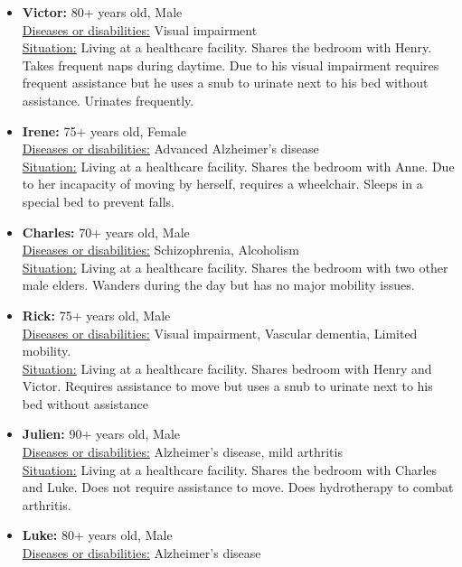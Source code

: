 \documentclass[oneside, twocolumn]{article}
\begin{document}
\begin{itemize}
	\item \textbf{Victor:} 80+ years old, Male \\
			\underline{Diseases or disabilities:} Visual impairment \\
			\underline{Situation:} Living at a healthcare facility. Shares the bedroom with Henry. Takes frequent naps during daytime. Due to his visual impairment requires frequent assistance but he uses a snub to urinate next to his bed without assistance. Urinates frequently. \\
	\item \textbf{Irene:} 75+ years old, Female \\
			\underline{Diseases or  disabilities:} Advanced Alzheimer's disease \\
			\underline{Situation:} Living at a healthcare facility. Shares the bedroom with  Anne. Due to her incapacity of moving by herself, requires a wheelchair. Sleeps in  a special bed to prevent falls. \\
	\item \textbf{Charles:} 70+ years old, Male \\
			\underline{Diseases or  disabilities:}  Schizophrenia, Alcoholism \\
			\underline{Situation:} Living at a healthcare facility. Shares the bedroom with two other male elders. Wanders during the day but has no major mobility issues. \\
	\item \textbf{Rick:} 75+ years old, Male \\
			\underline{Diseases or  disabilities:} Visual impairment, Vascular dementia,  Limited mobility. \\
			\underline{Situation:} Living at a healthcare facility. Shares bedroom with Henry and Victor. Requires assistance to move but uses a snub to urinate next to his bed without assistance \\
	\item \textbf{Julien:} 90+ years old, Male \\
			\underline{Diseases or disabilities:} Alzheimer's   disease, mild arthritis \\
			\underline{Situation:} Living at a healthcare facility. Shares the bedroom with Charles and Luke. Does not require assistance to move.  Does hydrotherapy to  combat arthritis. \\
	\item \textbf{Luke:} 80+ years old, Male \\
			\underline{Diseases or disabilities:} Alzheimer's disease \\

\end{itemize}
\end{document}
